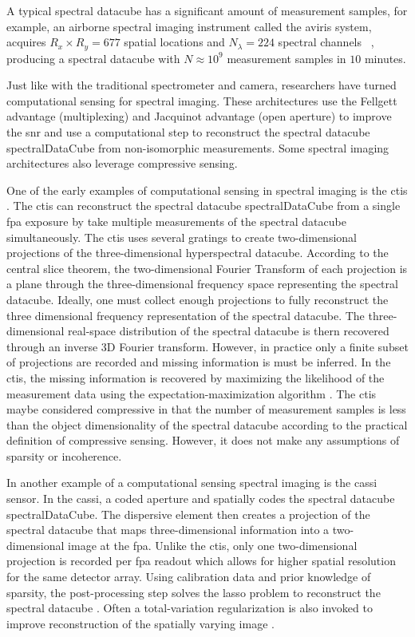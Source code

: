 A typical spectral datacube has a significant amount of measurement samples, for example, an airborne spectral imaging instrument called the  \gls{aviris} system, acquires $R_x \times R_y = 677$ spatial locations and $N_{\lambda} = 224$ spectral channels ~\cite{green1998imaging}, producing a spectral datacube with $N \approx 10^9$ measurement samples in $10$ minutes. 

Just like with the traditional spectrometer and camera, researchers have turned \gls{computational sensing} for spectral imaging. These architectures use the \gls{Fellgett advantage} (multiplexing) and \gls{Jacquinot advantage} (open aperture) to improve the \gls{snr} and use a computational step to reconstruct the spectral datacube \gls{spectralDataCube} from non-isomorphic measurements. Some spectral imaging architectures also leverage \gls{compressive sensing}. 

One of the early examples of computational sensing in spectral imaging is the \gls{ctis} \cite{descour1995computed}. The \gls{ctis} can reconstruct the spectral datacube \gls{spectralDataCube} from a single \gls{fpa} exposure by take multiple measurements of the spectral datacube simultaneously. The \gls{ctis} uses several gratings to create two-dimensional projections of the three-dimensional hyperspectral datacube. According to the central slice theorem, the two-dimensional Fourier Transform of each projection is a plane through the three-dimensional frequency space representing the spectral datacube. Ideally, one must collect enough projections to fully reconstruct the three dimensional frequency representation of the spectral datacube. The three-dimensional real-space distribution of the spectral datacube is thern recovered through an inverse 3D Fourier transform. However, in practice only a finite subset of projections are recorded and missing information is must be inferred. In the \gls{ctis}, the missing information is recovered by maximizing the likelihood of the measurement data using the expectation-maximization algorithm \cite{steven1993fundamentals, moon1996expectation}. The \gls{ctis} maybe considered compressive in that the number of measurement samples is less than the object dimensionality of the spectral datacube according to the practical definition of compressive sensing. However, it does not make any assumptions of sparsity or incoherence.

In another example of a computational sensing spectral imaging is the \acrfull{cassi} sensor. In the \gls{cassi}, a coded aperture and spatially codes the spectral datacube \gls{spectralDataCube}. The dispersive element then creates a projection of the spectral datacube that maps three-dimensional information into a two-dimensional image at the \gls{fpa}. Unlike the \gls{ctis}, only one two-dimensional projection is recorded per \gls{fpa} readout which allows for higher spatial resolution for the same detector array. Using calibration data and prior knowledge of sparsity, the post-processing step solves the \gls{lasso} problem to reconstruct the spectral datacube \cite{wagadarikar2008single, arce2014compressive}. Often a total-variation regularization is also invoked to improve reconstruction of the spatially varying image \cite{wagadarikar2008spectral, bioucas2007new}.

